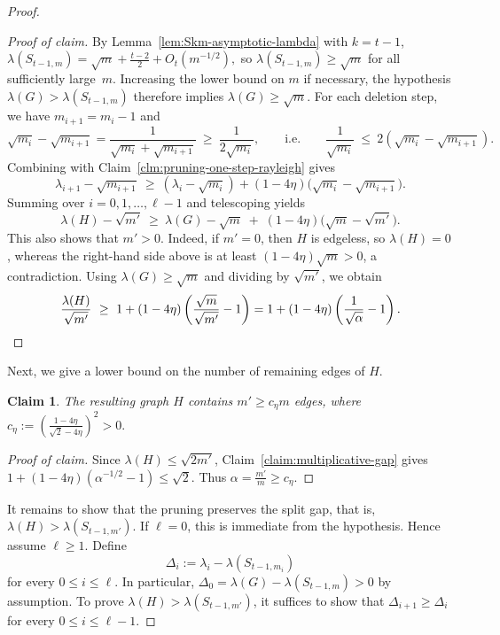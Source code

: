\documentclass[10pt,a4paper]{amsart}
\newtheorem{claim}{Claim}
\newenvironment{poc}{\begin{proof}[Proof of claim]\renewcommand*{\qedsymbol}{$\blacksquare$}}{\end{proof}}
\begin{document}
\begin{proof}
\begin{poc}
By Lemma~\ref{lem:Skm-asymptotic-lambda} with \(k=t-1\), $\lambda(S_{t-1,m})=\sqrt m+\frac{t-2}{2}+O_t(m^{-1/2}),$
 so $\lambda(S_{t-1,m})\ge \sqrt m$
for all sufficiently large~$m$.
Increasing the lower bound on \(m\) if necessary, the hypothesis
\(\lambda(G)>\lambda(S_{t-1,m})\) therefore implies \(\lambda(G)\ge \sqrt m\).
For each deletion step, we have $m_{i+1}=m_i-1$ and 
\[
  \sqrt{m_i}-\sqrt{m_{i+1}}
  =
  \frac{1}{\sqrt{m_i}+\sqrt{m_{i+1}}}
  \ \ge\ \frac{1}{2\sqrt{m_i}},
  \qquad\text{i.e.}\qquad
  \frac{1}{\sqrt{m_i}}\ \le\ 2(\sqrt{m_i}-\sqrt{m_{i+1}}).
\]
Combining with Claim~\ref{clm:pruning-one-step-rayleigh} gives
\[
  \lambda_{i+1}-\sqrt{m_{i+1}}
  \ \ge\
  (\lambda_i-\sqrt{m_i})+(1-4\eta)\bigl(\sqrt{m_i}-\sqrt{m_{i+1}}\bigr).
\]
Summing over $i=0,1,\dots,\ell-1$ and telescoping yields
\[
  \lambda(H)-\sqrt{m'}
  \ \ge\
  \lambda(G)-\sqrt m\;+\;(1-4\eta)\bigl(\sqrt m-\sqrt{m'}\bigr).
\]
This also shows that \(m'>0\). Indeed, if \(m'=0\), then \(H\) is edgeless, so \(\lambda(H)=0\), whereas the right-hand side above is at least \((1-4\eta)\sqrt m>0\), a contradiction.
Using $\lambda(G)\ge \sqrt m$ and dividing by $\sqrt{m'}$, we obtain
\[
  \frac{\lambda(H)}{\sqrt{m'}}
  \ \ge\
  1+(1-4\eta)\left(\frac{\sqrt m}{\sqrt{m'}}-1\right)
  =
  1+(1-4\eta)\left(\frac{1}{\sqrt\alpha}-1\right). \qedhere 
\]
\end{poc}

Next, we give a lower bound on the number of remaining edges of $H$.

\begin{claim} \label{cl:H-linearly-size}
The resulting graph $H$ contains $m' \ge c_{\eta}m$ edges, where        $c_{\eta}:=\left(\frac{1-4\eta}{\sqrt{2} - 4\eta}\right)^2>0.$
\end{claim}

\begin{poc}
Since $\lambda(H)\le \sqrt{2m'}$,
Claim~\ref{claim:multiplicative-gap} gives  
$1 + (1- 4\eta ) (\alpha^{-1/2} - 1) \le \sqrt{2}.$
Thus $\alpha=\frac{m'}{m}\ge c_{\eta}.$
\end{poc}
 
It remains to show that the pruning preserves the split gap, that is, $\lambda(H)>\lambda(S_{t-1,m'}).$
If \(\ell=0\), this is immediate from the hypothesis. Hence assume \(\ell\ge1\).
Define
\[
        \Delta_i := \lambda_i- \lambda(S_{t-1,m_i})
\]
for every $0\le i\le \ell$. 
In particular, $\Delta_0=\lambda(G)- \lambda(S_{t-1,m})>0$ by assumption. 
To prove $\lambda(H) > \lambda (S_{t-1,m'})$, it suffices to show that $\Delta_{i+1} \ge \Delta_i$ for every \(0\le i\le \ell-1\).


\end{proof}
\end{document}
